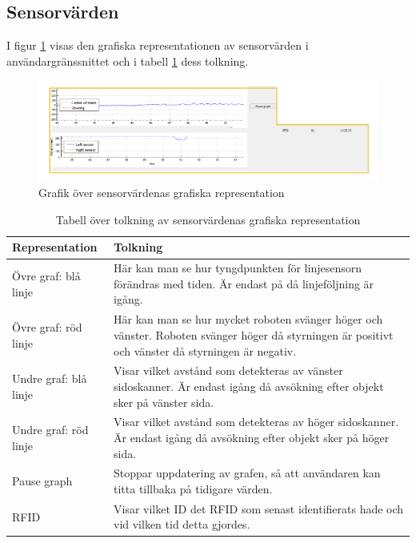 \documentclass[a4paper,12pt]{article}
\begin{document}
\subsection{Sensorvärden}
\label{subsec:sensor}
I figur \ref{fig:pc_sensor} visas den grafiska representationen av sensorvärden i användargränssnittet och i tabell \ref{tab:sensor} dess tolkning.

\begin{figure}[H]
	\centering
	\includegraphics[width=1.0\textwidth]{sensor.pdf}
	\caption{Grafik över sensorvärdenas grafiska representation}
	\label{fig:pc_sensor}
\end{figure}

\begin{table}[H]
    \centering
    \begin{tabularx}{\textwidth}{|l|X|}
        \hline \textbf{Representation} & \textbf{Tolkning} \\ \hline
        Övre graf: blå linje & Här kan man se hur tyngdpunkten för linjesensorn förändras med tiden. Är endast på då linjeföljning är igång.\\ \hline
        Övre graf: röd linje & Här kan man se hur mycket roboten svänger höger och vänster. Roboten svänger höger då styrningen är positivt och vänster då styrningen är negativ.\\ \hline
        Undre graf: blå linje & Visar vilket avstånd som detekteras av vänster sidoskanner. Är endast igång då avsökning efter objekt sker på vänster sida. \\ \hline
        Undre graf: röd linje & Visar vilket avstånd som detekteras av höger sidoskanner. Är endast igång då avsökning efter objekt sker på höger sida. \\ \hline
        Pause graph & Stoppar uppdatering av grafen, så att användaren kan titta tillbaka på tidigare värden.\\ \hline
        RFID & Visar vilket ID det RFID som senast identifierats hade och vid vilken tid detta gjordes. \\ \hline
    \end{tabularx}
\caption{Tabell över tolkning av sensorvärdenas grafiska representation}
\label{tab:sensor}
\end{table}
\end{document}
